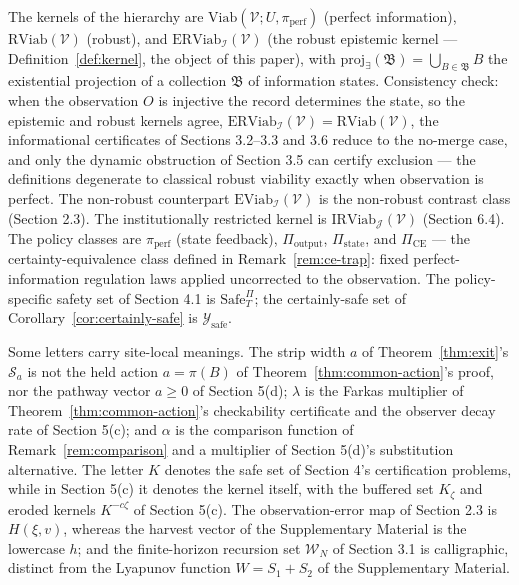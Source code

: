 \documentclass[10pt,twocolumn]{article}
\theoremstyle{definition}
\begin{document}
The kernels of the hierarchy are
\(\mathrm{Viab}(\mathcal{V}; U, \pi_{\mathrm{perf}})\) (perfect
information), \(\mathrm{RViab}(\mathcal{V})\) (robust), and
\(\mathrm{ERViab}_{\mathcal{I}}(\mathcal{V})\) (the robust epistemic
kernel --- Definition~\ref{def:kernel}, the object of this paper), with
\(\mathrm{proj}_{\exists}(\mathfrak{B}) = \bigcup_{B \in \mathfrak{B}} B\)
the existential projection of a collection \(\mathfrak{B}\) of information states. Consistency check: when the observation \(O\) is injective the record determines the state, so the epistemic and robust kernels agree, \(\mathrm{ERViab}_{\mathcal{I}}(\mathcal{V}) = \mathrm{RViab}(\mathcal{V})\), the informational certificates of Sections 3.2--3.3 and 3.6 reduce to the no-merge case, and only the dynamic obstruction of Section 3.5 can certify exclusion --- the definitions degenerate to classical robust viability exactly when observation is perfect. The non-robust counterpart
\(\mathrm{EViab}_{\mathcal{I}}(\mathcal{V})\) is the non-robust contrast class (Section 2.3). The institutionally restricted kernel is \(\mathrm{IRViab}_{\mathcal{J}}(\mathcal{V})\) (Section 6.4). The policy classes
are \(\pi_{\mathrm{perf}}\) (state feedback), \(\Pi_{\mathrm{output}}\),
\(\Pi_{\mathrm{state}}\), and \(\Pi_{\mathrm{CE}}\) --- the
certainty-equivalence class defined in Remark~\ref{rem:ce-trap}: fixed
perfect-information regulation laws applied uncorrected to the
observation. The policy-specific safety set of Section 4.1 is
\(\mathrm{Safe}^{\Pi}_T\); the certainly-safe set of Corollary~\ref{cor:certainly-safe} is
\(\mathcal{Y}_{\mathrm{safe}}\).

Some letters carry site-local meanings. The strip width \(a\) of
Theorem~\ref{thm:exit}'s \(\mathcal{S}_a\) is not the held action
\(a = \pi(B)\) of Theorem~\ref{thm:common-action}'s proof, nor the
pathway vector \(a \ge 0\) of Section 5(d); \(\lambda\) is the Farkas
multiplier of Theorem~\ref{thm:common-action}'s checkability
certificate and the observer decay rate of Section 5(c); and
\(\alpha\) is the comparison function of Remark~\ref{rem:comparison}
and a multiplier of Section 5(d)'s substitution alternative. The
letter \(K\) denotes the safe set of Section 4's certification
problems, while in Section 5(c) it denotes the kernel
itself, with the buffered set \(K_\zeta\) and eroded kernels
\(K^{-c\zeta}\) of Section 5(c). The observation-error map of
Section 2.3 is \(H(\xi, v)\), whereas the harvest vector of
the Supplementary Material is the lowercase \(h\); and the finite-horizon recursion
set \(\mathcal{W}_N\) of Section 3.1 is calligraphic, distinct from
the Lyapunov function \(W = S_1 + S_2\) of the Supplementary Material.
\end{document}

